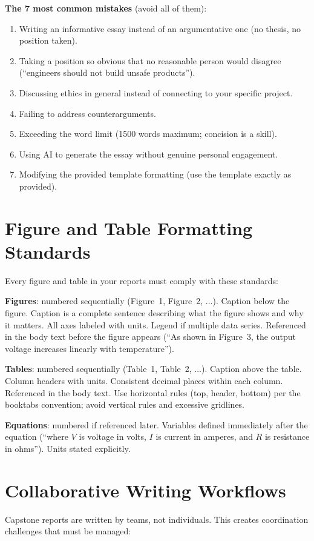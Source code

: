 \textbf{The 7 most common mistakes} (avoid all of them):
\begin{enumerate}[nosep,leftmargin=1.5em]
\item Writing an informative essay instead of an argumentative one (no thesis, no position taken).
\item Taking a position so obvious that no reasonable person would disagree (``engineers should not build unsafe products'').
\item Discussing ethics in general instead of connecting to your specific project.
\item Failing to address counterarguments.
\item Exceeding the word limit (1500 words maximum; concision is a skill).
\item Using AI to generate the essay without genuine personal engagement.
\item Modifying the provided template formatting (use the template exactly as provided).
\end{enumerate}

\section{Figure and Table Formatting Standards}
Every figure and table in your reports must comply with these standards:

\textbf{Figures}: numbered sequentially (Figure~1, Figure~2, ...). Caption below the figure. Caption is a complete sentence describing what the figure shows and why it matters. All axes labeled with units. Legend if multiple data series. Referenced in the body text before the figure appears (``As shown in Figure~3, the output voltage increases linearly with temperature'').

\textbf{Tables}: numbered sequentially (Table~1, Table~2, ...). Caption above the table. Column headers with units. Consistent decimal places within each column. Referenced in the body text. Use horizontal rules (top, header, bottom) per the booktabs convention; avoid vertical rules and excessive gridlines.

\textbf{Equations}: numbered if referenced later. Variables defined immediately after the equation (``where $V$ is voltage in volts, $I$ is current in amperes, and $R$ is resistance in ohms''). Units stated explicitly.



\section{Collaborative Writing Workflows}
Capstone reports are written by teams, not individuals. This creates coordination challenges that must be managed:

